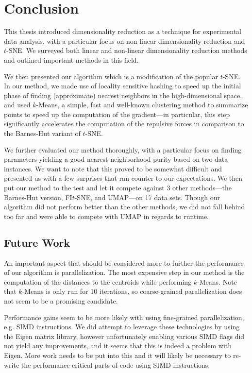 \chapter{Conclusion}\label{ch:end}

This thesis introduced dimensionality reduction as a technique for experimental
data analysis, with a particular focus on non-linear dimensionality reduction
and $t$-SNE. We surveyed both linear and non-linear dimensionality reduction
methods and outlined important methods in this field.

We then presented our algorithm which is a modification of the popular $t$-SNE.
In our method, we made use of locality sensitive hashing to speed up the initial
phase of finding (approximate) nearest neighbors in the high-dimensional space,
and used $k$-Means, a simple, fast and well-known clustering method to summarize
points to speed up the computation of the gradient---in particular, this step significantly
accelerates the computation of the repulsive forces in comparison to the Barnes-Hut
variant of $t$-SNE.

We further evaluated our method thoroughly, with a particular focus on finding parameters
yielding a good nearest neighborhood purity based on two data instances. We want to note that
this proved to be somewhat difficult and presented us with a few surprises that ran
counter to our expectations. We then put our method to the test and let it compete against
3 other methods---the Barnes-Hut version, FI$t$-SNE, and UMAP---on 17 data sets. Though
our algorithm did not perform better than the other methods, we did not fall behind too
far and were able to compete with UMAP in regards to runtime.

\section{Future Work}

An important aspect that should be considered more to further the performance of our algorithm is parallelization.
The most expensive step in our method is the computation of the distances to the centroids while
performing $k$-Means. Note that $k$-Means is only run for 10 iterations, so coarse-grained
parallelization does not seem to be a promising candidate.

Performance gains seem to be more
likely with using fine-grained parallelization, e.g. SIMD instructions. We did attempt to
leverage these technologies by using the Eigen matrix library, however unfortunately enabling
various SIMD flags did not yield any improvements, and it seems that this is indeed a problem
with Eigen. More work needs to be put into this and it will likely be necessary to re-write
the performance-critical parts of code using SIMD-instructions.

